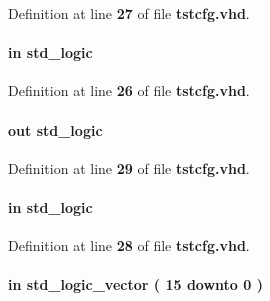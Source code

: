 Definition at line {\bf 27} of file {\bf tstcfg.\+vhd}.

\paragraph[{sdin}]{ {\bfseries \textcolor{keywordflow}{in}\textcolor{vhdlchar}{ }} {\bfseries \textcolor{comment}{std\+\_\+logic}\textcolor{vhdlchar}{ }} \hspace{0.3cm}{\ttfamily [Port]}}\label{clasststcfg_a689a085f705c45ec3c2821cbe3a33b19}


Definition at line {\bf 26} of file {\bf tstcfg.\+vhd}.

\paragraph[{sdout}]{ {\bfseries \textcolor{keywordflow}{out}\textcolor{vhdlchar}{ }} {\bfseries \textcolor{comment}{std\+\_\+logic}\textcolor{vhdlchar}{ }} \hspace{0.3cm}{\ttfamily [Port]}}\label{clasststcfg_aa9859b1193c781bb51a2e16215d90fb3}


Definition at line {\bf 29} of file {\bf tstcfg.\+vhd}.

\paragraph[{sen}]{ {\bfseries \textcolor{keywordflow}{in}\textcolor{vhdlchar}{ }} {\bfseries \textcolor{comment}{std\+\_\+logic}\textcolor{vhdlchar}{ }} \hspace{0.3cm}{\ttfamily [Port]}}\label{clasststcfg_a5e69a30218f15bf1e4421d24cad846c0}


Definition at line {\bf 28} of file {\bf tstcfg.\+vhd}.

\paragraph[{Si5351\+C\+\_\+\+C\+L\+K0\+\_\+\+C\+NT}]{ {\bfseries \textcolor{keywordflow}{in}\textcolor{vhdlchar}{ }} {\bfseries \textcolor{comment}{std\+\_\+logic\+\_\+vector}\textcolor{vhdlchar}{ }\textcolor{vhdlchar}{(}\textcolor{vhdlchar}{ }\textcolor{vhdlchar}{ } \textcolor{vhdldigit}{15} \textcolor{vhdlchar}{ }\textcolor{keywordflow}{downto}\textcolor{vhdlchar}{ }\textcolor{vhdlchar}{ } \textcolor{vhdldigit}{0} \textcolor{vhdlchar}{ }\textcolor{vhdlchar}{)}\textcolor{vhdlchar}{ }} \hspace{0.3cm}{\ttfamily [Port]}}\label{clasststcfg_a6fb17e5bcc78dfc89f402413539491d0}


